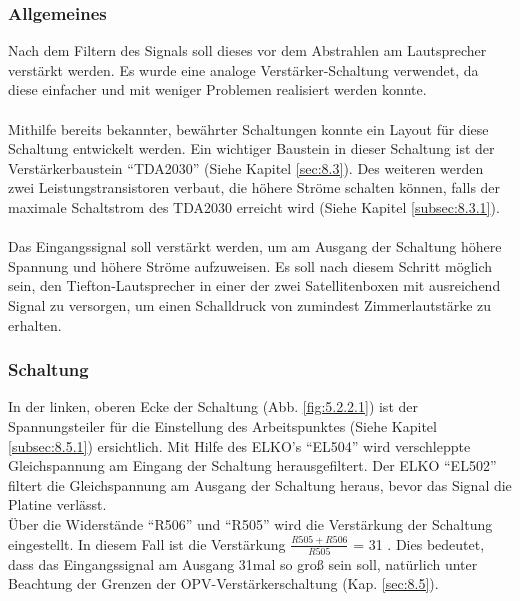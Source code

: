 \subsubsection{Allgemeines}\label{subsec:5.2.1}
Nach dem Filtern des Signals soll dieses vor dem Abstrahlen am Lautsprecher verstärkt werden.
Es wurde eine analoge Verstärker-Schaltung verwendet, da diese einfacher und mit weniger Problemen realisiert werden konnte.
\\ \\
Mithilfe bereits bekannter, bewährter Schaltungen konnte ein Layout für diese Schaltung entwickelt werden.
Ein wichtiger Baustein in dieser Schaltung ist der Verstärkerbaustein \enquote{TDA2030} (Siehe Kapitel \ref{sec:8.3}).
Des weiteren werden zwei Leistungstransistoren verbaut, die höhere Ströme schalten können, falls der maximale Schaltstrom des TDA2030 erreicht wird (Siehe Kapitel \ref{subsec:8.3.1}).
\\ \\
Das Eingangssignal soll verstärkt werden, um am Ausgang der Schaltung höhere Spannung und höhere Ströme aufzuweisen.
Es soll nach diesem Schritt möglich sein, den Tiefton-Lautsprecher in einer der zwei Satellitenboxen mit ausreichend Signal zu versorgen, um einen Schalldruck von zumindest Zimmerlautstärke zu erhalten. 

\newpage
\subsubsection{Schaltung}\label{subsec:5.2.2}
In der linken, oberen Ecke der Schaltung (Abb. \ref{fig:5.2.2.1}) ist der Spannungsteiler für die Einstellung des Arbeitspunktes (Siehe Kapitel \ref{subsec:8.5.1}) ersichtlich.
Mit Hilfe des ELKO's \enquote{EL504} wird verschleppte Gleichspannung am Eingang der Schaltung herausgefiltert.
Der ELKO \enquote{EL502} filtert die Gleichspannung am Ausgang der Schaltung heraus, bevor das Signal die Platine verlässt. \\
Über die Widerstände \enquote{R506} und \enquote{R505} wird die Verstärkung der Schaltung eingestellt.
In diesem Fall ist die Verstärkung $\frac{R505+R506}{R505}$ = 31 .
Dies bedeutet, dass das Eingangssignal am Ausgang 31mal so groß sein soll, natürlich unter Beachtung der Grenzen der OPV-Verstärkerschaltung (Kap. \ref{sec:8.5}).


